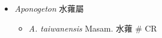 
  \begin{itemize}
 \item[] \textit{Aponogeton} 水蕹屬
                                
  \begin{itemize}
        \item[] \textit{A. taiwanensis} Masam.  水蕹  \# CR
  \end{itemize}
  \end{itemize}
